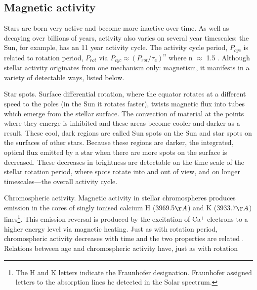 \subsection{Magnetic activity}
Stars are born very active and become more inactive over time.
As well as decaying over billions of years, activity also varies on several
year timescales: the Sun, for example, has an 11 year activity cycle.
The activity cycle period, $P_{cyc}$ is related to rotation period, $P_{rot}$
via $P_{cyc} \approx (P_{rot}/\tau_c)^n$ where n $\approx$ 1.5
\citep{Noyes1984}.
Although stellar activity originates from one mechanism only: magnetism,
it manifests in a variety of detectable ways, listed below.
\begin{itemize}
\item{Star spots.
Surface differential rotation, where the equator rotates at a different speed
to the poles (in the Sun it rotates faster), twists magnetic flux into tubes
which emerge from the stellar surface.
The convection of material at the points where they emerge is inhibited and
these areas become cooler and darker as a result.
These cool, dark regions are called Sun spots on the Sun and star spots on the
surfaces of other stars.
Because these regions are darker, the integrated, optical flux emitted by a
star when there are more spots on the surface is decreased.
These decreases in brightness are detectable on the time scale of the stellar
rotation period, where spots rotate into and out of view, and on longer
timescales---the overall activity cycle.
\item{Chromospheric activity.
Magnetic activity in stellar chromospheres produces emission in the cores of
singly ionised calcium H (3969.5$\AA$) and K (3933.7$\AA$) lines\footnote{The
H and K letters indicate the Fraunhofer designation.
Fraunhofer assigned letters to the absorption lines he detected in the Solar
spectrum.}.
This emission reversal is produced by the excitation of Ca$^+$ electrons to a
higher energy level via magnetic heating.
Just as with rotation period, chromospheric activity decreases with time and
the two properties are related \citep[\eg][]{Kraft1967, Noyes1984b}.
Relations between age and chromospheric activity have, just as with rotation
}}
\end{itemize}

